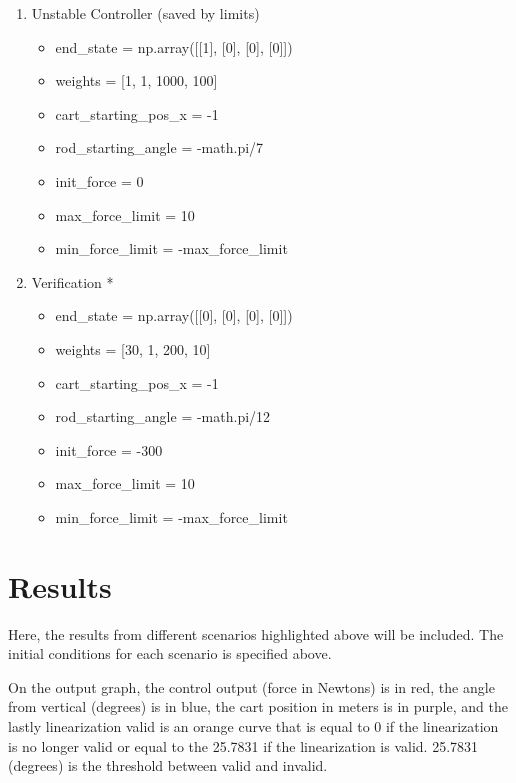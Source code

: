 \documentclass{article}
\begin{document}
\begin{enumerate}
    \item Unstable Controller (saved by limits)
        \begin{itemize}
            \item end\_state = np.array([[1], [0], [0], [0]])
            \item weights = [1, 1, 1000, 100]
            \item cart\_starting\_pos\_x = -1
            \item rod\_starting\_angle = -math.pi/7
            \item init\_force = 0
            \item max\_force\_limit = 10
            \item min\_force\_limit = -max\_force\_limit
        \end{itemize}
        
    \item Verification *
        \begin{itemize}
            \item end\_state = np.array([[0], [0], [0], [0]])
            \item weights = [30, 1, 200, 10]
            \item cart\_starting\_pos\_x = -1
            \item rod\_starting\_angle = -math.pi/12
            \item init\_force = -300
            \item max\_force\_limit = 10
            \item min\_force\_limit = -max\_force\_limit
        \end{itemize}

\end{enumerate}

\section{Results}

Here, the results from different scenarios highlighted above will be included. The initial conditions for each scenario is specified above.

On the output graph, the control output (force in Newtons) is in red, the angle from vertical (degrees) is in blue, the cart position in meters is in purple, and the lastly linearization valid is an orange curve that is equal to 0 if the linearization is no longer valid or equal to the 25.7831 if the linearization is valid. 25.7831 (degrees) is the threshold between valid and invalid.
\end{document}
